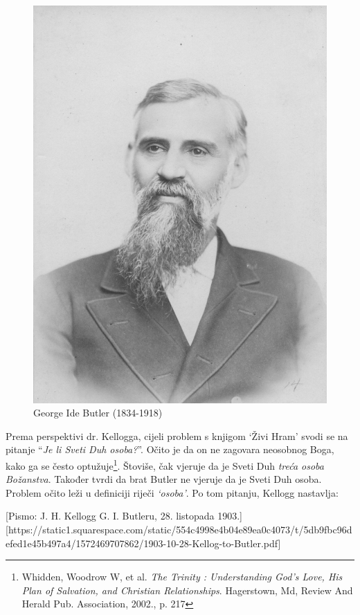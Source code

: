 \begin{figure}[hp]
    \centering
    \includegraphics[width=1\linewidth]{images/george-ide-butler.jpg}
    \caption*{George Ide Butler (1834-1918)}
    \label{fig:g-i-butler}
\end{figure}

Prema perspektivi dr. Kellogga, cijeli problem s knjigom ‘Živi Hram’ svodi se na pitanje “\textit{Je li Sveti Duh osoba?}”. Očito je da on ne zagovara neosobnog Boga, kako ga se često optužuje\footnote{Whidden, Woodrow W, et al. \textit{The Trinity : Understanding God's Love, His Plan of Salvation, and Christian Relationships}. Hagerstown, Md, Review And Herald Pub. Association, 2002., p. 217}. Štoviše, čak vjeruje da je Sveti Duh \textit{treća osoba Božanstva}. Također tvrdi da brat Butler ne vjeruje da je Sveti Duh osoba. Problem očito leži u definiciji riječi \textit{‘osoba’}. Po tom pitanju, Kellogg nastavlja:

[Pismo: J. H. Kellogg G. I. Butleru, 28. listopada 1903.][https://static1.squarespace.com/static/554c4998e4b04e89ea0c4073/t/5db9fbc96defed1e45b497a4/1572469707862/1903-10-28-Kellog-to-Butler.pdf]

